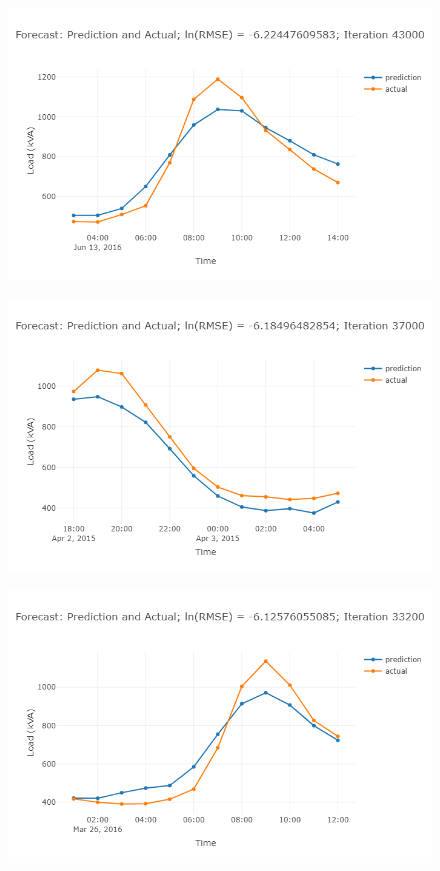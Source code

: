 \begin{figure}
\centering
\includegraphics[width=0.95\linewidth]{"images/prelim-plots/newplot (6)"}
\caption{}
\end{figure}

\begin{figure}
\centering
\includegraphics[width=0.95\linewidth]{"images/prelim-plots/newplot (7)"}
\caption{}
\end{figure}

\begin{figure}
\centering
\includegraphics[width=0.95\linewidth]{"images/prelim-plots/newplot (8)"}
\caption{}
\end{figure}

